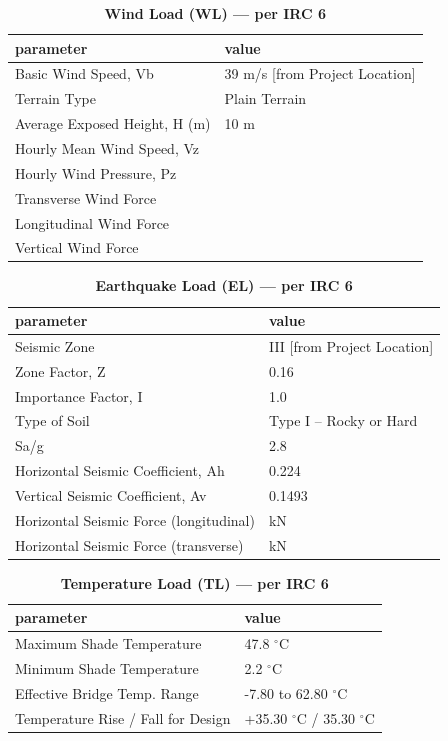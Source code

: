 \documentclass[12pt,a4paper]{report}
\numberwithin{table}{chapter}
\numberwithin{figure}{chapter}
\begin{document}
\vspace{1em}
\begin{longtable}{|L{5.5cm}|p{10.0cm}|}
\caption{\textbf{Wind Load (WL) --- per IRC 6}}
\hline
\textbf{parameter} & \textbf{value} \\
\hline
\textnormal{Basic Wind Speed, Vb} & 39 m/s [from Project Location] \\[6pt]
\hline
\textnormal{Terrain Type} & Plain Terrain \\[6pt]
\hline
\textnormal{Average Exposed Height, H (m)} & 10 m \\[6pt]
\hline
\textnormal{Hourly Mean Wind Speed, Vz} &  \\[6pt]
\hline
\textnormal{Hourly Wind Pressure, Pz} &  \\[6pt]
\hline
\textnormal{Transverse Wind Force} &  \\[6pt]
\hline
\textnormal{Longitudinal Wind Force} &  \\[6pt]
\hline
\textnormal{Vertical Wind Force} &  \\[6pt]
\hline
\end{longtable}

\vspace{1em}
\begin{longtable}{|L{5.5cm}|p{10.0cm}|}
\caption{\textbf{Earthquake Load (EL) --- per IRC 6}}
\hline
\textbf{parameter} & \textbf{value} \\
\hline
\textnormal{Seismic Zone} & III [from Project Location] \\[6pt]
\hline
\textnormal{Zone Factor, Z} & 0.16 \\[6pt]
\hline
\textnormal{Importance Factor, I} & 1.0 \\[6pt]
\hline
\textnormal{Type of Soil} & Type I – Rocky or Hard \\[6pt]
\hline
\textnormal{Sa/g} & 2.8 \\[6pt]
\hline
\textnormal{Horizontal Seismic Coefficient, Ah} & 0.224 \\[6pt]
\hline
\textnormal{Vertical Seismic Coefficient, Av} & 0.1493 \\[6pt]
\hline
\textnormal{Horizontal Seismic Force (longitudinal)} &  kN \\[6pt]
\hline
\textnormal{Horizontal Seismic Force (transverse)} &  kN \\[6pt]
\hline
\end{longtable}

\vspace{1em}
\begin{longtable}{|L{5.5cm}|p{10.0cm}|}
\caption{\textbf{Temperature Load (TL) --- per IRC 6}}
\hline
\textbf{parameter} & \textbf{value} \\
\hline
\textnormal{Maximum Shade Temperature} & 47.8 $^\circ$C \\[6pt]
\hline
\textnormal{Minimum Shade Temperature} & 2.2 $^\circ$C \\[6pt]
\hline
\textnormal{Effective Bridge Temp. Range} & -7.80 to 62.80 $^\circ$C \\[6pt]
\hline
\textnormal{Temperature Rise / Fall for Design} & +35.30 $^\circ$C / \textminus{}35.30 $^\circ$C \\[6pt]
\hline
\end{longtable}
\end{document}
